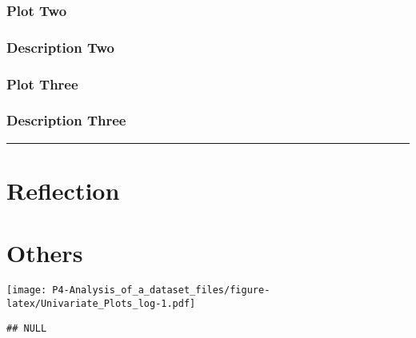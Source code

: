 \documentclass[]{article}
\begin{document}
\subsubsection{Plot Two}\label{plot-two}

\subsubsection{Description Two}\label{description-two}

\subsubsection{Plot Three}\label{plot-three}

\subsubsection{Description Three}\label{description-three}

\begin{center}\rule{0.5\linewidth}{\linethickness}\end{center}

\section{Reflection}\label{reflection}

\section{Others}\label{others}

\texttt{[image: P4-Analysis\_of\_a\_dataset\_files/figure-latex/Univariate\_Plots\_log-1.pdf]}

\begin{verbatim}
## NULL
\end{verbatim}


\end{document}
